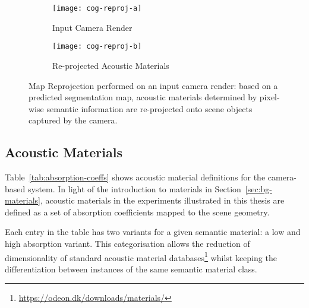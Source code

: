 \begin{figure}
    \centering
    \begin{subfigure}[t]{0.49\textwidth}
       \centering
       \texttt{[image: cog-reproj-a]}
       \caption{Input Camera Render}
       \label{fig:cog-reproj-a}
    \end{subfigure}
    \begin{subfigure}[t]{0.49\textwidth}
       \centering
       \texttt{[image: cog-reproj-b]}
       \caption{Re-projected Acoustic Materials}
       \label{fig:cog-reproj-b}
    \end{subfigure}
\caption[Material tagging segmentation reprojection system]{Map Reprojection performed on an input camera render: based on a predicted segmentation map, acoustic materials determined by pixel-wise semantic information are re-projected onto scene objects captured by the camera.}
\label{fig:cog-reprojection}
\end{figure}

\subsection{Acoustic Materials}

Table~\ref{tab:absorption-coeffs} shows acoustic material definitions for the camera-based system. In light of the introduction to materials in Section~\ref{sec:bg-materials}, acoustic materials in the experiments illustrated in this thesis are defined as a set of absorption coefficients mapped to the scene geometry.\par
Each entry in the table has two variants for a given semantic material: a low and high absorption variant. This categorisation allows the reduction of dimensionality of standard acoustic material databases\footnote{\url{https://odeon.dk/downloads/materials/}} whilst keeping the differentiation between instances of the same semantic material class.


